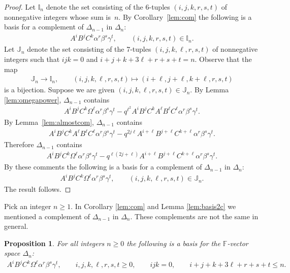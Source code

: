 \documentclass[11pt]{article}
\numberwithin{equation}{section}
\newtheorem{Proposition}[Theorem]{Proposition}
{\theoremstyle{definition}
\newtheorem{Note}[Theorem]{Note}
\newtheorem{Definition}[Theorem]{Definition}
\newtheorem{Problem}[Theorem]{Problem}
}
\begin{document}
\begin{proof}
Let $\mathbb I_n$ denote the set consisting of the 6-tuples
$(i,j,k,r,s,t)$ of nonnegative integers whose sum is~$n$.
By Corollary~\ref{lem:com} the
following
is a basis for a complement of
$\Delta_{n-1}$ in $\Delta_n$:
\begin{gather*}
A^iB^jC^k\alpha^r\beta^s\gamma^t, \qquad
(i,j,k,r,s,t) \in {\mathbb I}_n.
\end{gather*}
Let $\mathbb J_n$ denote the set consisting of the 7-tuples
$(i,j,k,\ell,r,s,t)$ of nonnegative integers such that
$ijk=0$ and
$i+j+k+3\ell+r+s+t = n$.
Observe that the map
\begin{gather*}
\mathbb J_n  \to  \mathbb I_n,
\qquad
(i,j,k,\ell,r,s,t)  \mapsto   (i+\ell,j+\ell,k+\ell,r,s,t)
\end{gather*}
is a bijection.
Suppose we are given $(i,j,k,\ell,r,s,t) \in \mathbb J_n$.
By
Lemma \ref{lem:omegapower},
$\Delta_{n-1}$ contains
\begin{gather*}
A^iB^jC^k\Omega^\ell \alpha^r \beta^s \gamma^t -
q^{\ell^2} A^iB^jC^k A^\ell B^\ell C^\ell \alpha^r \beta^s \gamma^t.
\end{gather*}
By Lemma~\ref{lem:almostcom},  $\Delta_{n-1}$ contains
\begin{gather*}
A^iB^jC^k A^\ell B^\ell C^\ell \alpha^r \beta^s \gamma^t
-
q^{2j \ell} A^{i+\ell}B^{j+\ell}C^{k+\ell}  \alpha^r \beta^s \gamma^t.
\end{gather*}
Therefore $\Delta_{n-1}$ contains
\begin{gather*}
A^iB^jC^k\Omega^\ell \alpha^r \beta^s \gamma^t -
q^{\ell(2j+ \ell)} A^{i+\ell}B^{j+\ell}C^{k+\ell}  \alpha^r \beta^s \gamma^t.
\end{gather*}
By these comments the following is a basis for a complement of
$\Delta_{n-1}$ in $\Delta_n$:
\begin{gather*}
A^iB^jC^k\Omega^\ell \alpha^r\beta^s\gamma^t, \qquad
(i,j,k,\ell,r,s,t) \in \mathbb J_n.
\end{gather*}
The result follows.
\end{proof}

\begin{Note}
Pick an integer $n \geq 1$.
In
Corollary
\ref{lem:com} and
Lemma
\ref{lem:basis2c}
we mentioned a
complement of $\Delta_{n-1}$ in $\Delta_n$. These
complements are not the same
in general.
\end{Note}


\begin{Proposition}
\label{lem:basis2n}
For all integers $n\geq 0$
the following is a basis
for
the $\mathbb F$-vector space
$\Delta_n$:
\begin{gather*}
 A^iB^jC^k\Omega^\ell \alpha^r \beta^s \gamma^t, \qquad
i,j,k,\ell, r,s,t\geq 0,
\qquad ijk=0,
 \qquad
i+j+k+3\ell+r+s+t \leq  n.
\end{gather*}
\end{Proposition}
\end{document}
